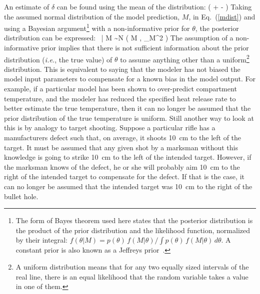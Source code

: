 An estimate of $\delta$ can be found using the mean of the distribution:
\be
   \delta \approx \exp \left(  + - \right) \label{delta}
\ee
Taking the assumed normal distribution of the model prediction, $M$, in Eq.~(\ref{mdist}) and using
a Bayesian argument\footnote{The form of Bayes theorem used here states that the posterior distribution is the product of
the prior distribution and the likelihood function, normalized by their integral:
$f(\theta|M)= p(\theta) \, f(M|\theta)/\int p(\theta) \, f(M|\theta) \, d\theta$.
A constant prior is also known as a Jeffreys prior~\cite{Gelman:Stats}.}
with a non-informative prior for $\theta$, the posterior distribution can be expressed:
\be
   \delta \, \theta \; | \; M \sim N \left( M \; , \; \sigma_M^2 \right) \label{thetaeq}
\ee
The assumption of a non-informative prior implies that there is not sufficient information about the
prior distribution ({\em i.e.}, the true value) of
$\theta$ to assume anything other than a uniform\footnote{A uniform distribution means that for any two equally sized intervals of the real line,
there is an equal likelihood that the random variable takes a value in one of them.} distribution.
This is equivalent to saying that the modeler has not biased the model input parameters to compensate for a known
bias in the model output. For example, if a particular model has been shown to over-predict compartment temperature, and the modeler has reduced the specified heat release
rate to better estimate the true temperature, then it can no longer be assumed that the prior distribution of the true temperature is uniform.
Still another way to look at this is by analogy to target shooting. Suppose a particular rifle
has a manufacturers defect such that, on average, it shoots 10~cm to the left of the target. It must be assumed that any given shot by a marksman without this knowledge is
going to strike 10~cm to the left of the intended target. However, if the marksman knows of the defect, he or she will probably aim 10~cm to the right of the
intended target to compensate for the defect. If that is the case, it can no longer be assumed that the intended target was 10~cm to the right of the bullet hole.

